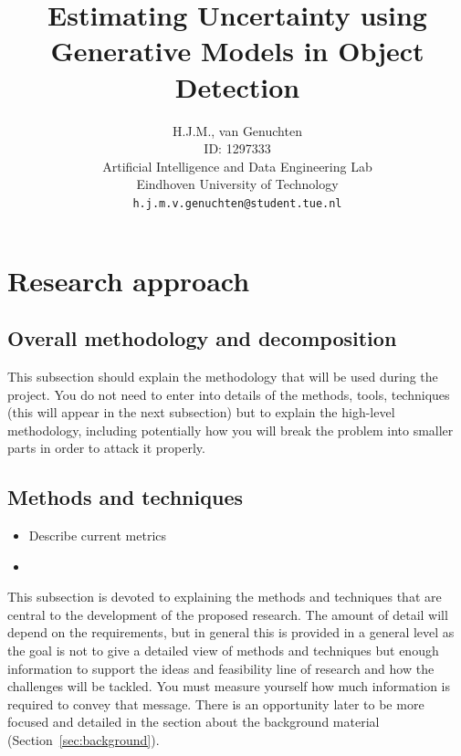 \documentclass{article}
\title{Estimating Uncertainty using Generative Models in Object Detection}
\author{
 H.J.M., van Genuchten \\
 ID: 1297333\\
 Artificial Intelligence and Data Engineering Lab\\
Eindhoven University of Technology\\
  \texttt{h.j.m.v.genuchten@student.tue.nl} \\
}
\begin{document}





\section{Research approach}
\label{sec:approach}
\subsection{Overall methodology and decomposition}

This subsection should explain the methodology that will be used during the project. You do not need to enter into details of the methods, tools, techniques (this will appear in the next subsection) but to explain the high-level methodology, including potentially how you will break the problem into smaller parts in order to attack it properly.

\subsection{Methods and techniques}

\begin{itemize}
  \item Describe current metrics
  \item
\end{itemize}

This subsection is devoted to explaining the methods and techniques that are central to the development of the proposed research. The amount of detail will depend on the requirements, but in general this is provided in a general level as the goal is not to give a detailed view of methods and techniques but enough information to support the ideas and feasibility line of research and how the challenges will be tackled. You must measure yourself how much information is required to convey that message. There is an opportunity later to be more focused and detailed in the section about the background material (Section~\ref{sec:background}).

\end{document}
